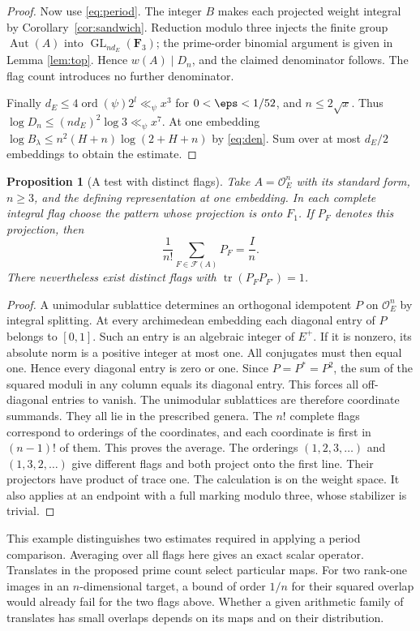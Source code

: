 \documentclass[a4paper,11pt]{article}
\newtheorem{proposition}{Proposition}[section]
\theoremstyle{definition}
\theoremstyle{remark}
\numberwithin{equation}{section}
\newcommand{\Aut}{\operatorname{Aut}}
\newcommand{\GL}{\operatorname{GL}}
\newcommand{\OO}{\mathcal O}
\begin{document}
\begin{proof}
Now use \eqref{eq:period}. The integer \(B\) makes each projected weight integral by Corollary~\ref{cor:sandwich}. Reduction modulo three injects the finite group \(\Aut(A)\) into \(\GL_{nd_E}(\mathbf F_3)\); the prime-order binomial argument is given in Lemma \ref{lem:top}. Hence \(w(A)\mid D_n\), and the claimed denominator follows. The flag count introduces no further denominator.

Finally \(d_E\le4\operatorname{ord}(\psi)2^l\ll_\psi x^3\) for \(0<\eps<1/52\), and \(n\le2\sqrt x\). Thus \(\log D_n\le (nd_E)^2\log3\ll_\psi x^7\). At one embedding \(\log B_\lambda\le n^2(H+n)\log(2+H+n)\) by \eqref{eq:den}. Sum over at most \(d_E/2\) embeddings to obtain the estimate.
\end{proof}

\begin{proposition}[A test with distinct flags]\label{prop:flag}
Take \(A=\OO_E^n\) with its standard form, \(n\ge3\), and the defining representation at one embedding. In each complete integral flag choose the pattern whose projection is onto \(F_1\). If \(P_F\) denotes this projection, then
\[
 \frac{1}{n!}\sum_{F\in\mathcal F(A)}P_F=\frac{I}{n}.
\]
There nevertheless exist distinct flags with \(\operatorname{tr}(P_FP_{F'})=1\).
\end{proposition}
\begin{proof}
A unimodular sublattice determines an orthogonal idempotent \(P\) on \(\OO_E^n\) by integral splitting. At every archimedean embedding each diagonal entry of \(P\) belongs to \([0,1]\). Such an entry is an algebraic integer of \(E^+\). If it is nonzero, its absolute norm is a positive integer at most one. All conjugates must then equal one. Hence every diagonal entry is zero or one. Since \(P=P^*=P^2\), the sum of the squared moduli in any column equals its diagonal entry. This forces all off-diagonal entries to vanish. The unimodular sublattices are therefore coordinate summands. They all lie in the prescribed genera. The \(n!\) complete flags correspond to orderings of the coordinates, and each coordinate is first in \((n-1)!\) of them. This proves the average. The orderings \((1,2,3,\ldots)\) and \((1,3,2,\ldots)\) give different flags and both project onto the first line. Their projectors have product of trace one. The calculation is on the weight space. It also applies at an endpoint with a full marking modulo three, whose stabilizer is trivial.
\end{proof}

This example distinguishes two estimates required in applying a period comparison. Averaging over all flags here gives an exact scalar operator. Translates in the proposed prime count select particular maps. For two rank-one images in an \(n\)-dimensional target, a bound of order \(1/n\) for their squared overlap would already fail for the two flags above. Whether a given arithmetic family of translates has small overlaps depends on its maps and on their distribution.
\end{document}

